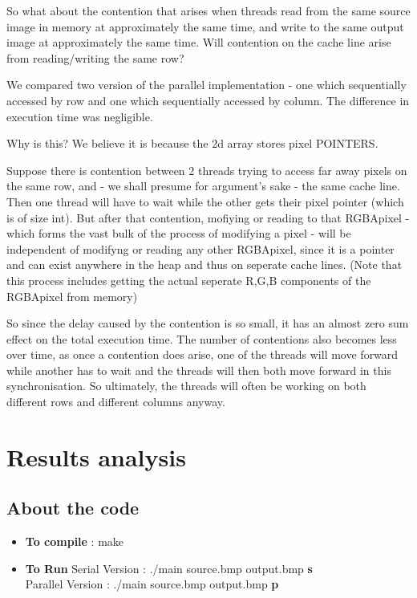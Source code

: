\documentclass[paper=a4, fontsize=11pt]{scrartcl} %
\numberwithin{equation}{section} %
\numberwithin{figure}{section} %
\numberwithin{table}{section} %
\begin{document}
So what about the contention that arises when threads read from the same source image in memory at approximately the same time, and write to the same output image at approximately the same time. Will contention on the cache line arise from reading/writing the same row?

We compared two version of the parallel implementation - one which sequentially accessed by row and one which sequentially accessed by column. The difference in execution time was negligible.

Why is this? We believe it is because the 2d array stores pixel POINTERS.

Suppose there is contention between 2 threads trying to access far away pixels on the same row, and - we shall presume for argument's sake - the same cache line. Then one thread will have to wait while the other gets their pixel pointer (which is of size int). But after that contention, mofiying or reading to that RGBApixel - which forms the vast bulk of the process of modifying a pixel - will be independent of modifyng or reading any other RGBApixel, since it is a pointer and can exist anywhere in the heap and thus on seperate cache lines. (Note that this process includes getting the actual seperate R,G,B components of the RGBApixel from memory)

So since the delay caused by the contention is so small, it has an almost zero sum effect on the total execution time. The number of contentions also becomes less over time, as once a contention does arise, one of the threads will move forward while another has to wait and the threads will then both move forward in this synchronisation. So ultimately, the threads will often be working on both different rows and different columns anyway.


\section{Results analysis}

\subsection{About the code}
\begin{itemize}

\item \textbf{To compile}  : make
\item \textbf{To Run}
	\subitem Serial Version : ./main source.bmp output.bmp \textbf{s} \\  
	\subitem Parallel Version : ./main source.bmp output.bmp \textbf{p} \\
	
\end{itemize}
\end{document}
